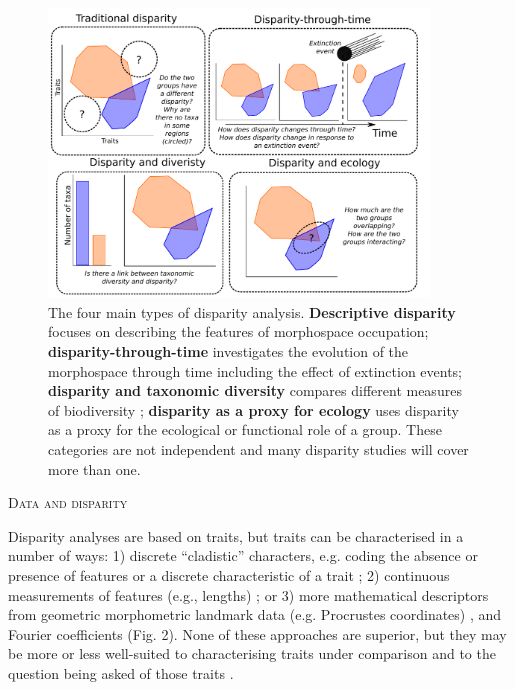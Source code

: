 \documentclass[12pt,letterpaper]{article}
\renewcommand{\section}[1]{%
\bigskip
\begin{center}
\begin{Large}
\normalfont\scshape #1
\medskip
\end{Large}
\end{center}}
\begin{document}
\begin{figure}[!htbp]
\centering
   \includegraphics[width=0.9\textwidth]{Figures/figure_disparities.pdf}
\caption{
    The four main types of disparity analysis. \textbf{Descriptive disparity} focuses on describing the features of morphospace occupation; \textbf{disparity-through-time} investigates the evolution of the morphospace through time including the effect of extinction events; \textbf{disparity and taxonomic diversity} compares different measures of biodiversity ; \textbf{disparity as a proxy for ecology} uses disparity as a proxy for the ecological or functional role of a group.
    These categories are not independent and many disparity studies will cover more than one.
}
\label{Fig:disparity}
\end{figure}



\section{Data and disparity}

\noindent Disparity analyses are based on traits, but traits can be characterised in a number of ways:
	1) discrete ``cladistic'' characters, e.g. coding the absence or presence of features or a discrete characteristic of a trait \citep[][e.g]{Close2015-qi};
	2) continuous measurements of features (e.g., lengths) \citep[][e.g]{Anderson2001-qb}; or
	3) more mathematical descriptors from geometric morphometric landmark data (e.g. Procrustes coordinates) \citep[][e.g]{Cooney2017-ly}, and Fourier coefficients \citep[][e.g]{Foote1995-do, Spriggs2018-nu} (Fig. 2).
None of these approaches are superior, but they may be more or less well-suited to characterising traits under comparison and to the question being asked of those traits \citep{hetherington2015cladistic,Hopkins2017-cf}.
\end{document}
